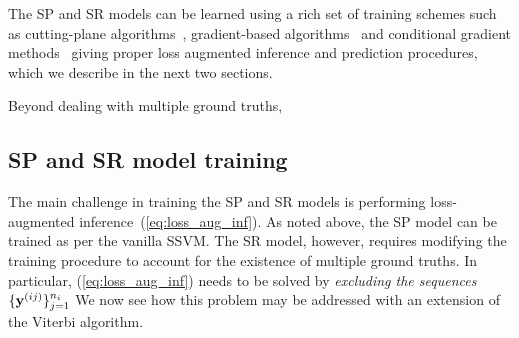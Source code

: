 The SP and SR models can be learned using a rich set of training schemes such as 
cutting-plane algorithms~\cite{joachims2009predicting}, %
gradient-based algorithms~\cite{ratliff2006subgradient} %
and conditional gradient methods~\cite{lacoste2013block} %
giving proper loss augmented inference and prediction procedures,
which we describe in the next two sections.

Beyond dealing with multiple ground truths,

\secmoveup
\subsection{SP and SR model training}
\label{ssec:training}
\textmoveup

The main challenge in training the SP and SR models is performing loss-augmented inference~(\ref{eq:loss_aug_inf}).
As noted above, the SP model can be trained as per the vanilla SSVM.
The SR model, however, requires modifying the training procedure to account for the existence of multiple ground truths.
In particular, (\ref{eq:loss_aug_inf}) needs to be solved by \emph{excluding the sequences} $\{\mathbf{y}^{({ij})}\}_{j=1}^{n_i}$ We now see how this problem may be addressed with an extension of the Viterbi algorithm.


